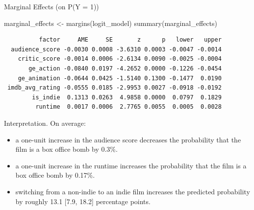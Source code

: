 \documentclass[
  10pt,
  ignorenonframetext,
]{beamer}
\newenvironment{Shaded}{\begin{snugshade}}{\end{snugshade}}
\newcommand{\FunctionTok}[1]{\textcolor[rgb]{0.28,0.35,0.67}{#1}}
\newcommand{\NormalTok}[1]{\textcolor[rgb]{0.00,0.23,0.31}{#1}}
\newcommand{\OtherTok}[1]{\textcolor[rgb]{0.00,0.23,0.31}{#1}}
\begin{document}
\begin{frame}[fragile]{Marginal Effects (on P(Y = 1))}
\label{marginal-effects-on-py-1}
\scriptsize

\begin{Shaded}
\begin{Highlighting}[]
\NormalTok{marginal\_effects }\OtherTok{\textless{}{-}} \FunctionTok{margins}\NormalTok{(logit\_model)}
\FunctionTok{summary}\NormalTok{(marginal\_effects)}
\end{Highlighting}
\end{Shaded}

\begin{verbatim}
          factor     AME     SE       z      p   lower   upper
  audience_score -0.0030 0.0008 -3.6310 0.0003 -0.0047 -0.0014
    critic_score -0.0014 0.0006 -2.6134 0.0090 -0.0025 -0.0004
       ge_action -0.0840 0.0197 -4.2652 0.0000 -0.1226 -0.0454
    ge_animation -0.0644 0.0425 -1.5140 0.1300 -0.1477  0.0190
 imdb_avg_rating -0.0555 0.0185 -2.9953 0.0027 -0.0918 -0.0192
        is_indie  0.1313 0.0263  4.9858 0.0000  0.0797  0.1829
         runtime  0.0017 0.0006  2.7765 0.0055  0.0005  0.0028
\end{verbatim}

Interpretation. On average:

\begin{itemize}
\item
  a one-unit increase in the audience score decreases the probability
  that the film is a box office bomb by 0.3\%.
\item
  a one-unit increase in the runtime increases the probability that the
  film is a box office bomb by 0.17\%.
\item
  switching from a non-indie to an indie film increases the predicted
  probability by roughly 13.1 {[}7.9, 18.2{]} percentage points.
\end{itemize}
\end{frame}
\end{document}
